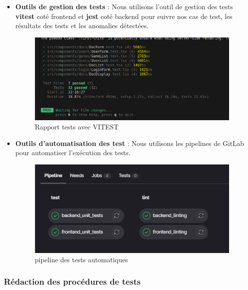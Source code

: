 \begin{itemize}\addtolength{\itemsep}{-0.35\baselineskip}%
	\item \textbf{Outils de gestion des tests }: Nous utilisons l'outil de gestion des tests \textbf{vitest} coté frontend et \textbf{jest} coté backend pour suivre nos cas de test, les résultats des tests et les anomalies détectées.
	      \begin{figure}[h]
		      \center
		      \includegraphics[scale=0.7]{./images/test_frontend_il.png}
		      \caption[Rapport test frontend avec VITEST]{Rapport tests avec VITEST}\label{fig:test_frontend_il}
	      \end{figure}
	\item \textbf{Outils d'automatisation des test} : Nous utilisons les pipelines de GitLab pour automatiser l'exécution des tests.
	      \begin{figure}[h]
		      \center
		      \includegraphics[scale=0.9]{./images/pipeline_tests.png}
		      \caption[pipeline des tests automatiques]{pipeline des tests automatiques}\label{fig:pipeline_tests}
	      \end{figure}
\end{itemize}


\subsubsection{Rédaction des procédures de tests}


